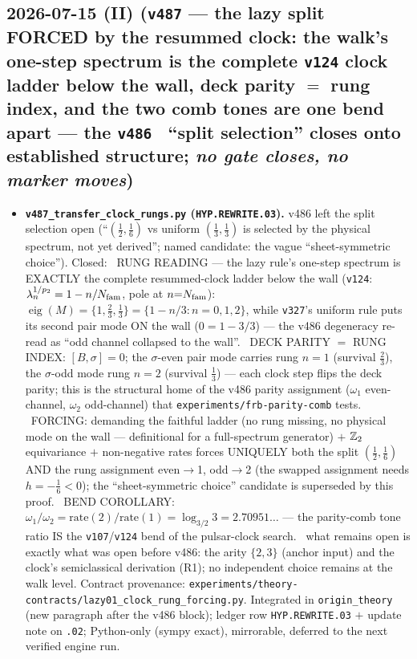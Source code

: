 \subsection*{2026-07-15 (II) (\texttt{v487} --- the lazy split FORCED by the resummed clock: the walk's one-step spectrum is the complete \texttt{v124} clock ladder below the wall, deck parity $=$ rung index, and the two comb tones are one bend apart --- the \texttt{v486} \mO\ ``split selection'' closes onto established structure; \emph{no gate closes, no marker moves})}
\begin{itemize}[leftmargin=1.5em]
\item \textbf{\texttt{v487\_transfer\_clock\_rungs.py} (\texttt{HYP.REWRITE.03}).} v486 left the split
selection open (``$(\tfrac12,\tfrac16)$ vs uniform $(\tfrac13,\tfrac13)$ is selected by the physical
spectrum, not yet derived''; named candidate: the vague ``sheet-symmetric choice''). Closed: \mE\ RUNG
READING --- the lazy rule's one-step spectrum is EXACTLY the complete resummed-clock ladder below the
wall (\texttt{v124}: $\lambda_n^{1/p_2}=1-n/N_{\mathrm{fam}}$, pole at $n{=}N_{\mathrm{fam}}$):
$\operatorname{eig}(M)=\{1,\tfrac23,\tfrac13\}=\{1-n/3:n=0,1,2\}$, while \texttt{v327}'s uniform rule
puts its second pair mode ON the wall ($0=1-3/3$) --- the v486 degeneracy re-read as ``odd channel
collapsed to the wall''. \mE\ DECK PARITY $=$ RUNG INDEX: $[B,\sigma]=0$; the $\sigma$-even pair mode
carries rung $n{=}1$ (survival $\tfrac23$), the $\sigma$-odd mode rung $n{=}2$ (survival $\tfrac13$) ---
each clock step flips the deck parity; this is the structural home of the v486 parity assignment
($\omega_1$ even-channel, $\omega_2$ odd-channel) that \texttt{experiments/frb-parity-comb} tests.
\mE\ FORCING: demanding the faithful ladder (no rung missing, no physical mode on the wall ---
definitional for a full-spectrum generator) $+$ $\mathbb{Z}_2$ equivariance $+$ non-negative rates forces
UNIQUELY both the split $(\tfrac12,\tfrac16)$ AND the rung assignment even$\to$1, odd$\to$2 (the swapped
assignment needs $h=-\tfrac16<0$); the ``sheet-symmetric choice'' candidate is superseded by this proof.
\mE\ BEND COROLLARY: $\omega_1/\omega_2=\mathrm{rate}(2)/\mathrm{rate}(1)=\log_{3/2}3=2.70951\ldots$ ---
the parity-comb tone ratio IS the \texttt{v107}/\texttt{v124} bend of the pulsar-clock search. \mO\ what
remains open is exactly what was open before v486: the arity $\{2,3\}$ (anchor input) and the clock's
semiclassical derivation (R1); no independent choice remains at the walk level. Contract provenance:
\texttt{experiments/theory-contracts/lazy01\_clock\_rung\_forcing.py}. Integrated in
\texttt{origin\_theory} (new paragraph after the v486 block); ledger row \texttt{HYP.REWRITE.03} $+$
update note on \texttt{.02}; Python-only (sympy exact), mirrorable, deferred to the next verified engine
run.
\end{itemize}

